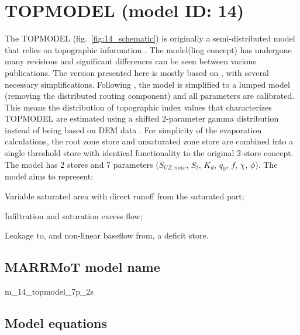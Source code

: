 \section{TOPMODEL (model ID: 14)}
The TOPMODEL (fig.~\ref{fig:14_schematic}) is originally a semi-distributed model that relies on topographic information \citep{BEVEN1979}. 
The model(ling concept) has undergone many revisions and significant differences can be seen between various publications. 
The version presented here is mostly based on \citet{Beven1995}, with several necessary simplifications. 
Following \citet{Clark2008a}, the model is simplified to a lumped model (removing the distributed routing component) and all parameters are calibrated. 
This means the distribution of topographic index values that characterizes TOPMODEL are estimated using a shifted 2-parameter gamma distribution instead of being based on DEM data \citep{Sivapalan1987,Clark2008a}. 
For simplicity of the evaporation calculations, the root zone store and unsaturated zone store are combined into a single threshold store with identical functionality to the original 2-store concept. 
The model has 2 stores and 7 parameters ($S_{UZ,max}$, $S_t$, $K_d$, $q_0$, $f$, $\chi$, $\phi$). 
The model aims to represent:

\begin{itemizecompact}
\item Variable saturated area with direct runoff from the saturated part;
\item Infiltration and saturation excess flow;
\item Leakage to, and non-linear baseflow from, a deficit store.
\end{itemizecompact}

\subsection{MARRMoT model name}
m\_14\_topmodel\_7p\_2s \\

\subsection{Model equations}

